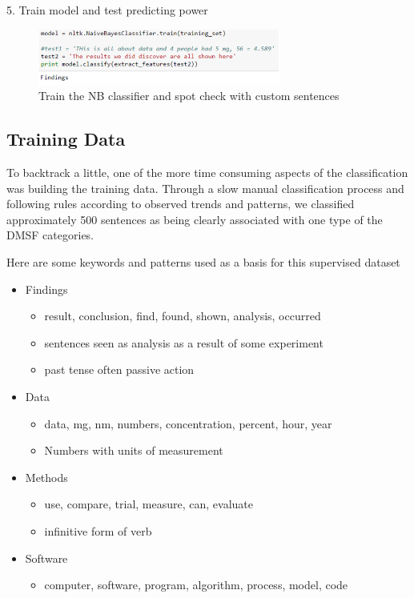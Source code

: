 \documentclass{article} %
\begin{document}
5.	Train model and test predicting power
 
\begin{figure}[h!]
\centering
\includegraphics[width=80mm]{Screenshot_123.png}
\caption{Train the NB classifier and spot check with custom sentences}
\end{figure}


\subsection{Training Data}

	To backtrack a little, one of the more time consuming aspects of the classification was building the training data. Through a slow manual classification process and following rules according to observed trends and patterns, we classified approximately 500 sentences as being clearly associated with one type of the DMSF categories. 
    
Here are some keywords and patterns used as a basis for this supervised dataset

\begin{itemize}
\item Findings
\begin{itemize}
\item result, conclusion, find, found, shown, analysis, occurred
\item sentences seen as analysis as a result of some experiment
\item past tense often passive action
\end{itemize}
\item Data
\begin{itemize}
\item data, mg, nm, numbers, concentration, percent, hour, year
\item Numbers with units of measurement
\end{itemize}
\item Methods
\begin{itemize}
\item use, compare, trial, measure, can, evaluate
\item infinitive form of verb
\end{itemize}
\item Software
\begin{itemize}
\item computer, software, program, algorithm, process, model, code
\end{itemize}
\end{itemize}
\end{document}
